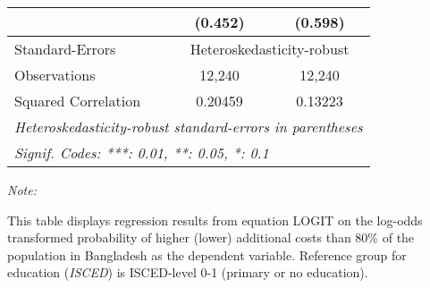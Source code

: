\begin{table}[htbp!]
\begin{adjustbox}{width = 1\textwidth, max height = 0.95\textheight, center}
\begin{threeparttable}[b]
\begin{tabular}{lcc}
                                 & (0.452)        & (0.598)\\   
            \midrule 
            Standard-Errors & \multicolumn{2}{c}{Heteroskedasticity-robust} \\ 
            Observations         & 12,240         & 12,240\\  
            Squared Correlation  & 0.20459        & 0.13223\\  
            \midrule \midrule
            \multicolumn{3}{l}{\emph{Heteroskedasticity-robust standard-errors in parentheses}}\\
            \multicolumn{3}{l}{\emph{Signif. Codes: ***: 0.01, **: 0.05, *: 0.1}}\\
         \end{tabular}
         
         \begin{tablenotes}\item \medskip \textit{Note:}
            \item This table displays regression results from equation LOGIT on the log-odds transformed probability of higher (lower) additional costs than 80\% of the population in Bangladesh as the dependent variable. Reference group for education (\textit{ISCED}) is ISCED-level 0-1 (primary or no education).
         \end{tablenotes}
      \end{threeparttable}
   \end{adjustbox}
\end{table}


